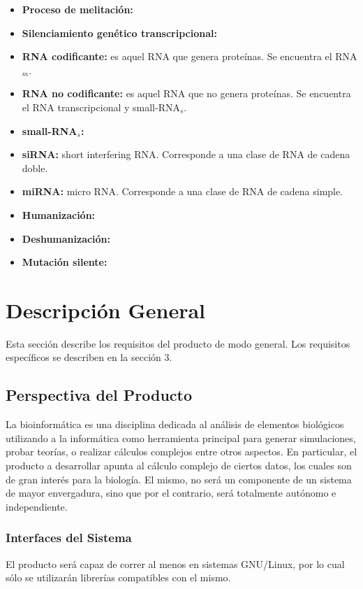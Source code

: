 \documentclass[10pt,a4paper,english,spanish]{article}
\begin{document}
\begin{itemize}
	\item \textbf{Proceso de melitación:}	
	\item \textbf{Silenciamiento genético transcripcional:}	
	\item \textbf{RNA codificante:} es aquel RNA que genera proteínas. Se encuentra el RNA$_m$.
	\item \textbf{RNA no codificante:} es aquel RNA que no genera proteínas. Se encuentra el RNA transcripcional y small-RNA$_s$.
	\item \textbf{small-RNA$_s$:} 
	\item \textbf{siRNA:} short interfering RNA. Corresponde a una clase de RNA de cadena doble.   
	\item \textbf{miRNA:} micro RNA. Corresponde a una clase de RNA de cadena simple. 
	\item \textbf{Humanización:} 				
	\item \textbf{Deshumanización:}				
	\item \textbf{Mutación silente:}				

\end{itemize}

\section{Descripción General}
\label{section-desc-gral}
Esta sección describe los requisitos del producto de modo general. Los
requisitos específicos se describen en la sección 3.

\subsection{Perspectiva del Producto}
La bioinformática es una disciplina dedicada al análisis de elementos biológicos utilizando a la informática como herramienta principal para generar simulaciones, probar teorías, o realizar cálculos complejos entre otros aspectos. En particular, el producto a desarrollar apunta al cálculo complejo de ciertos datos, los cuales son de gran interés para la biología. El mismo, no será un componente de un sistema de mayor envergadura, sino que por el contrario, será totalmente autónomo e independiente. 

	\subsubsection{Interfaces del Sistema}
		El producto será capaz de correr al menos en sistemas GNU/Linux, por lo cual sólo se utilizarán librerías 			compatibles con el mismo.
\end{document}

